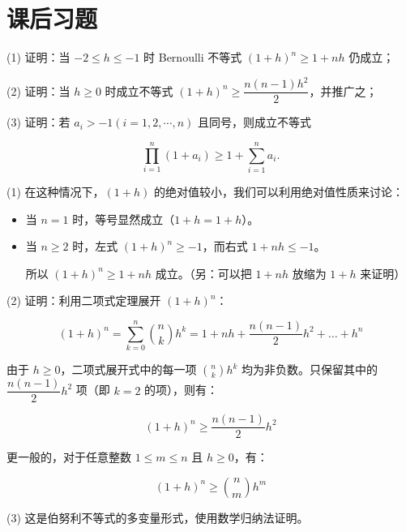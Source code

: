 \section{课后习题}

\begin{exercise}

(1) 证明：当 $-2 \leqslant h \leqslant -1$ 时 Bernoulli 不等式 $\displaystyle (1+h)^n \geqslant 1+nh$ 仍成立；

(2) 证明：当 $h \geqslant 0$ 时成立不等式 $\displaystyle (1+h)^n \geqslant \dfrac{n(n-1)h^2}{2}$，并推广之；

(3) 证明：若 $a_i > -1 \displaystyle (i=1,2,\cdots,n)$ 且同号，则成立不等式

$$
\displaystyle \prod_{i=1}^n (1+a_i) \geqslant 1+\sum_{i=1}^n a_i.
$$

\end{exercise}

(1) 在这种情况下，$\displaystyle (1+h)$ 的绝对值较小，我们可以利用绝对值性质来讨论：

\begin{itemize}
  \item {当 $\displaystyle n=1$ 时，等号显然成立（$\displaystyle 1+h = 1+h$）。

}\item {当 $\displaystyle n \ge 2$ 时，左式 $\displaystyle (1+h)^n \ge -1$，而右式 $\displaystyle 1+nh \le -1$。

所以 $\displaystyle (1+h)^n \ge 1+nh$ 成立。（另：可以把 $1+nh$ 放缩为 $1+h$ 来证明）

}
\end{itemize}

(2) 证明：利用二项式定理展开 $\displaystyle (1+h)^n$：

$$
\displaystyle (1+h)^n = \sum_{k=0}^n \binom{n}{k} h^k = 1 + nh + \dfrac{n(n-1)}{2}h^2 + \dots + h^n
$$

由于 $\displaystyle h \ge 0$，二项式展开式中的每一项 $\displaystyle \binom{n}{k}h^k$ 均为非负数。只保留其中的 $\displaystyle \dfrac{n(n-1)}{2}h^2$ 项（即 $\displaystyle k=2$ 的项），则有：

$$
\displaystyle (1+h)^n \ge \dfrac{n(n-1)}{2}h^2
$$

更一般的，对于任意整数 $\displaystyle 1 \le m \le n$ 且 $\displaystyle h \ge 0$，有：

$$
\displaystyle (1+h)^n \ge \binom{n}{m} h^m
$$

(3) 这是伯努利不等式的多变量形式，使用数学归纳法证明。

